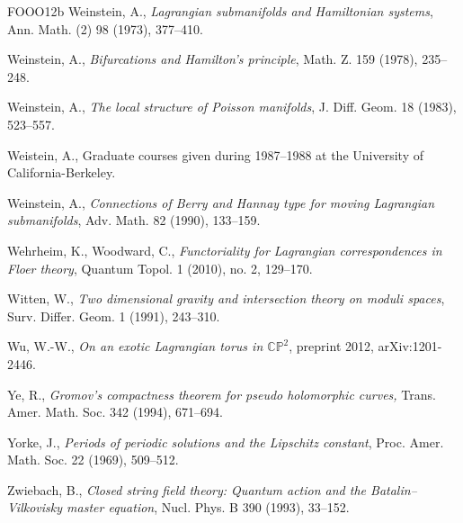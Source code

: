 \begin{thebibliography}{FOOO12b}
 Weinstein, A., \emph{Lagrangian submanifolds and Hamiltonian systems}, Ann. Math.
  (2) 98 (1973), 377–410.

 Weinstein, A., \emph{Bifurcations and Hamilton’s principle}, Math. Z. 159 (1978),
  235–248.

 Weinstein, A., \emph{The local structure of Poisson manifolds}, J. Diﬀ. Geom. 18
  (1983), 523–557.

 Weistein, A., Graduate courses given during 1987–1988 at the University of
  California-Berkeley.

 Weinstein, A., \emph{Connections of Berry and Hannay type for moving Lagrangian
  submanifolds}, Adv. Math. 82 (1990), 133–159.

 Wehrheim, K., Woodward, C., \emph{Functoriality for Lagrangian correspon\-dences in
  Floer theory}, Quantum Topol. 1 (2010), no. 2, 129–170.

 Witten, W., \emph{Two dimensional gravity and intersection theory on moduli spaces},
  Surv. Diﬀer. Geom. 1 (1991), 243–310.

 Wu, W.-W., \emph{On an exotic Lagrangian torus in $\mathbb{CP}^2$}, preprint 2012,
  arXiv:1201-2446.

 Ye, R., \emph{Gromov’s compactness theorem for pseudo holomorphic curves,} Trans.
  Amer. Math. Soc. 342 (1994), 671–694.

 Yorke, J., \emph{Periods of periodic solutions and the Lipschitz constant}, Proc.
  Amer. Math. Soc. 22 (1969), 509–512.

 Zwiebach, B., \emph{Closed string field theory: Quantum action and the
  Batalin–Vilkovisky master equation}, Nucl. Phys. B 390 (1993), 33–152.

\end{thebibliography}
\endgroup
